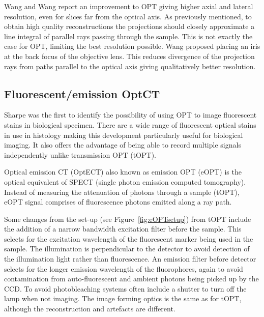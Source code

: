 \documentclass[12pt]{article}
\begin{document}
Wang and Wang report an improvement to OPT giving higher axial and lateral resolution, even for slices far from the optical axis. \cite{Wang:2006hy, Wang:2007} As previously mentioned, to obtain high quality reconstructions the projections should closely approximate a line integral of parallel rays passing through the sample. \cite{Wang:2006hy} This is not exactly the case for  OPT, limiting the best resolution possible. Wang proposed placing an iris at the back focus of the objective lens. This reduces divergence of the projection rays from paths parallel to the optical axis giving qualitatively better resolution.


\subsection{Fluorescent/emission  OptCT}
\label{subsec:eOPT}

Sharpe was the first to identify the possibility of using OPT to image fluorescent stains in biological specimen. \cite{Sharpe:2002jp} There are a wide range of fluorescent optical stains in use in histology making this development particularly useful for biological imaging. It also offers the advantage of being able to record multiple signals independently unlike  transmission OPT (tOPT). \cite{Sharpe:2002jp} 


Optical emission CT (OptECT) also known as emission OPT (eOPT) is the optical equivalent of SPECT (single photon emission computed tomography). \cite{Oldham:2007ku}  Instead of measuring the attenuation of photons through a sample (tOPT), eOPT signal comprises of fluorescence photons emitted along a ray path. \cite{Walls:2005ja}



Some changes from the set-up (see Figure~\ref{fig:eOPTsetup}) from tOPT  include the addition of a narrow bandwidth excitation filter before the sample. This selects for the excitation wavelength of the fluorescent marker being used in the sample. The illumination is perpendicular to the detector to avoid detection of the illumination light rather than fluorescence. An emission filter before detector selects for the longer emission wavelength of the fluorophores, again to avoid contamination from auto-fluorescent and ambient photons being picked up by the CCD. To avoid photobleaching systems often include a shutter to turn off the lamp when not imaging.  The image forming optics is the same as for tOPT, although the reconstruction and artefacts are different. \cite{Walls:2005ja}
\end{document}
